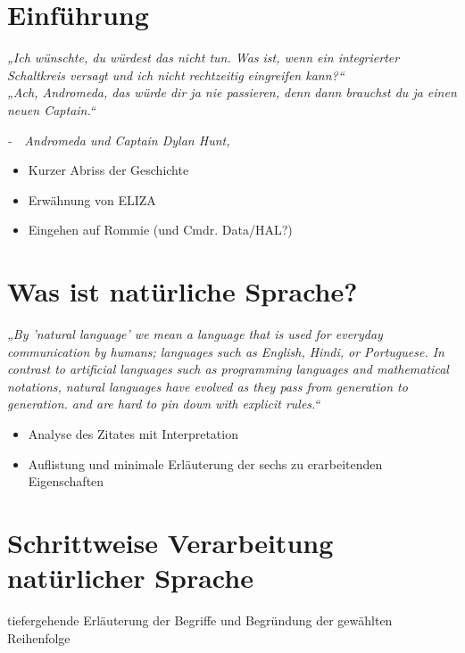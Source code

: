 \documentclass[12pt,twoside]{article}
\theoremstyle{plain}
\theoremstyle{definition}
\theoremstyle{remark}
\begin{document}
\setcounter{tocdepth}{2} 					%
\tableofcontents
{}
\clearpage



\section{Einführung}
\label{sec:intro}
	\textit{„Ich wünschte, du würdest das nicht tun.
	Was ist, wenn ein integrierter Schaltkreis versagt und ich nicht rechtzeitig eingreifen kann?“\\
	„Ach, Andromeda, das würde dir ja nie passieren, denn dann brauchst du ja einen neuen Captain.“}
	\begin{flushright}
		\textit{-~~Andromeda und Captain Dylan Hunt, \cite{ADA102}}
	\end{flushright}
	\begin{itemize}
	    \item Kurzer Abriss der Geschichte
	    \item Erwähnung von ELIZA
	    \item Eingehen auf Rommie (und Cmdr. Data/HAL?)
	\end{itemize}

\section{Was ist natürliche Sprache?}
\label{sec:def_lang}
\textit{„By 'natural language' we mean a language that is used for everyday communication by humans; languages such as English, Hindi, or Portuguese.
        In contrast to artificial languages such as programming languages and mathematical notations, natural languages have evolved as they pass from generation to generation.
        and are hard to pin down with explicit rules.“} \cite{Bird2009}
\begin{itemize}
    \item Analyse des Zitates mit Interpretation
    \item Auflistung und minimale Erläuterung der sechs zu erarbeitenden Eigenschaften
\end{itemize}

\section{Schrittweise Verarbeitung natürlicher Sprache}
\label{sec:meth}
tiefergehende Erläuterung der Begriffe und Begründung der gewählten Reihenfolge
\end{document}

